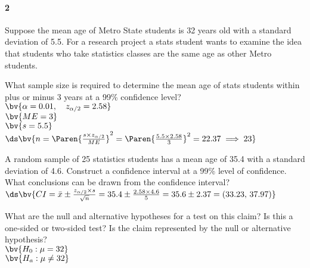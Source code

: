 \documentclass{article}
\begin{document}
\begin{flushleft}
\begin{enumalpha}
\end{enumalpha}



\newpage
\paragraph{2} Suppose the mean age of Metro State students is 32 years old with a standard deviation of 5.5. For a research project a stats student wants to examine the idea that students who take statistics classes are the same age as other Metro students. 
\begin{enumalpha}
\item What sample size is required to determine the mean age of stats students within plus or minus 3 years at a 99\% confidence level?\\
\medskip
$\bv{\alpha = 0.01, \quad z_{\alpha/2} = 2.58}$\\
$\bv{ME = 3}$\\
$\bv{s = 5.5}$\\ \bigskip
$\ds \bv{n = \Paren{\frac{s \times z_{\alpha/2}}{ME}}^2 = \Paren{\frac{5.5 \times 2.58}{3}}^2 = 22.37 \implies 23}$
\vspace{0.5in}


\item A random sample of 25 statistics students has a mean age of 35.4 with a standard deviation of 4.6. Construct a confidence interval at a 99\% level of confidence. What conclusions can be drawn from the confidence interval?\\
\bigskip
$\ds \bv{CI = \bar x \pm \frac{z_{\alpha/2} \times s}{\sqrt{n} } = 35.4 \pm \frac{2.58 \times 4.6}{5} = 35.6 \pm 2.37 = (33.23, \, 37.97)}$\\
\bigskip
{}
\vspace{0.5in}

\item What are the null and alternative hypotheses for a test on this claim? Is this a one-sided or two-sided test? Is the claim represented by the null or alternative hypothesis?\\
\medskip
$\bv{H_0: \mu = 32}$\\
$\bv{H_a: \mu \ne 32}$\\
\\
\vspace{.5in}


\end{enumalpha}
\end{flushleft}
\end{document}
